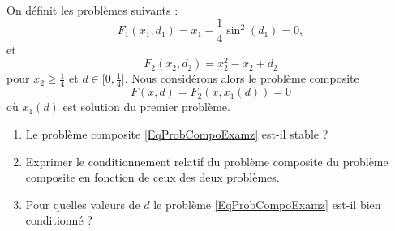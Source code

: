 
\begin{exercice}\label{exoexamens-0000}

	On définit les problèmes suivants :
	\begin{equation}
		F_1(x_1,d_1)=x_1-\frac{1}{ 4 }\sin^2(d_1)=0,
	\end{equation}
	et
	\begin{equation}
		F_2(x_2,d_2)=x_2^2-x_2+d_2
	\end{equation}
	pour $x_2\geq \frac{1}{ 4 }$ et $d\in\mathopen[ 0,\frac{1}{ 4 } \mathclose]$. Nous considérons alors le problème composite
	\begin{equation}	\label{EqProbCompoExamz}
		F(x,d)=F_2(x,x_1(d))=0
	\end{equation}
	où $x_1(d)$ est solution du premier problème.

	\begin{enumerate}

		\item
			Le problème composite \eqref{EqProbCompoExamz} est-il stable ?
		\item
			Exprimer le conditionnement relatif du problème composite du problème composite en fonction de ceux des deux problèmes.
		\item
			Pour quelles valeurs de $d$ le problème \eqref{EqProbCompoExamz} est-il bien conditionné ?

	\end{enumerate}

\end{exercice}
